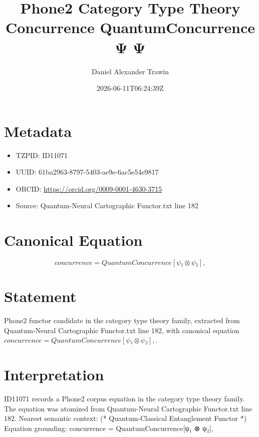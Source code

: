 \documentclass[11pt]{article}
\title{Phone2 Category Type Theory Concurrence QuantumConcurrence Ψ Ψ}
\author{Daniel Alexander Trawin}
\date{2026-06-11T06:24:39Z}
\begin{document}
\maketitle
\section*{Metadata}
\begin{itemize}
\item TZPID: ID11071
\item UUID: 61ba2963-8797-5403-ae9e-6ac5e54e9817
\item ORCID: \url{https://orcid.org/0009-0001-4630-3715}
\item Source: Quantum-Neural Cartographic Functor.txt line 182
\end{itemize}
\section*{Canonical Equation}
\[
concurrence = QuantumConcurrence[ψ₁ ⊗ ψ₂],
\]
\section*{Statement}
Phone2 functor candidate in the category type theory family, extracted from Quantum-Neural Cartographic Functor.txt line 182, with canonical equation $concurrence = QuantumConcurrence[ψ₁ ⊗ ψ₂],$.
\section*{Interpretation}
ID11071 records a Phone2 corpus equation in the category type theory family. The equation was atomized from Quantum-Neural Cartographic Functor.txt line 182. Nearest semantic context: (* Quantum-Classical Entanglement Functor *) Equation grounding: concurrence = QuantumConcurrence[ψ₁ ⊗ ψ₂],
\end{document}
